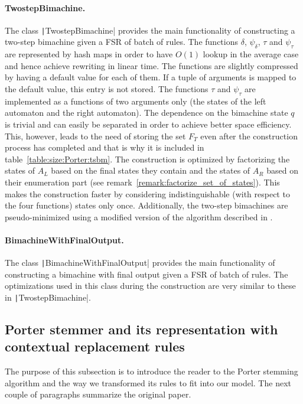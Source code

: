 \documentclass{article}
\begin{document}
	\paragraph{TwostepBimachine.} The class \texttt|TwostepBimachine| provides the main functionality of constructing a two-step bimachine given a FSR of batch of rules. The functions $\delta$, $\psi_\delta$, $\tau$ and $\psi_\tau$ are represented by hash maps in order to have $O(1)$ lookup in the average case and hence achieve rewriting in linear time. The functions are slightly compressed by having a default value for each of them. If a tuple of arguments is mapped to the default value, this entry is not stored.
	The functions $\tau$ and $\psi_\tau$ are implemented as a functions of two arguments only (the states of the left automaton and the right automaton). The dependence on the bimachine state $q$ is trivial and can easily be separated in order to achieve better space efficiency. This, however, leads to the need of storing the set $F_T$ even after the construction process has completed and that is why it is included in table~\ref{table:size:Porter:tsbm}. The construction is optimized by factorizing the states of $A_L$ based on the final states they contain and the states of $A_R$ based on their enumeration part (see remark~\ref{remark:factorize_set_of_states}). This makes the construction faster by considering indistinguishable (with respect to the four functions) states only once.
	Additionally, the two-step bimachines are pseudo-minimized using a modified version of the algorithm described in \cite[section~6.3]{Mihov-FST-2019}.
	
	\paragraph{BimachineWithFinalOutput.} The class \texttt|BimachineWithFinalOutput| provides the main functionality of constructing a bimachine with final output given a FSR of batch of rules. The optimizations used in this class during the construction are very similar to these in \texttt|TwostepBimachine|.
	
	\subsection{Porter stemmer and its representation with contextual replacement rules}
	\label{subsection:implementation:Porter}
	The purpose of this subsection is to introduce the reader to the Porter stemming algorithm \cite{Porter-stemmer} and the way we transformed its rules to fit into our model. The next couple of paragraphs summarize the original paper.
	
\end{document}
